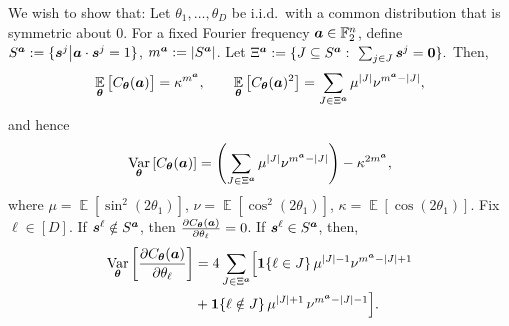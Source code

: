 \documentclass{article}
\theoremstyle{plain}
\theoremstyle{definition}
\theoremstyle{remark}
\begin{document}
We wish to show that: Let $\theta_1,\dots,\theta_D$ be i.i.d.\ with a common distribution that is symmetric about $0$. For a fixed Fourier frequency ${\bm{a}} \in \mathbb{F}_2^n$, define $S^{{\bm{a}}} := \{ {\bm{s}^j} \big| {\bm{a}} \cdot {\bm{s}^j} = 1 \}$, $
m^{\bm{a}} := \abs{S^{{\bm{a}}}}$. Let $
\Xi^{\bm{a}}:= \{J\subseteq S^{\bm{a}}:\ \sum_{j\in J}{\bm{s}^j}=\mathbf 0 \}.$ Then, 
\begin{equation*}
\operatorname*{\mathbb{E}}_{\bm{\theta}}\big[C_{\bm{\theta}}({\bm{a}})\big] = \kappa^{m^{\bm{a}}}, \qquad
\operatorname*{\mathbb{E}}_{\bm{\theta}}\big[C_{\bm{\theta}}({\bm{a}})^2\big] = \sum_{J\in \Xi^{\bm{a}}} \mu^{|J|} \nu^{m^{\bm{a}}-|J|},
\end{equation*}
and hence
\begin{equation*}
     \operatorname*{Var}_{\bm{\theta}} \left[ C_{\bm{\theta}}({\bm{a}}) \right] = 
\left(\sum_{J\in \Xi^{\bm{a}}} \mu^{|J|} \nu^{m^{\bm{a}}-|J|}\right) - \kappa^{2m^{\bm{a}}},
\end{equation*}
where $\mu=\operatorname*{\mathbb{E}}[\sin^2(2\theta_1)]$, $\nu=\operatorname*{\mathbb{E}}[\cos^2(2\theta_1)]$, $\kappa=\operatorname*{\mathbb{E}}[\cos(2\theta_1)]$. Fix $\ell\in[D]$. If ${\bm{s}^\ell} \notin S^{\bm{a}}$, then $ \frac{\partial C_{\bm{\theta}}({\bm{a}})}{\partial \theta_\ell}=0$. If ${\bm{s}^\ell} \in S^{\bm{a}}$, then, 
\begin{align*}
\operatorname*{Var}_{\bm{\theta}} \left[ \frac{\partial C_{\bm{\theta}}({\bm{a}})}{\partial \theta_\ell} \right]
&= 4\sum_{J\in \Xi^{\bm{a}}}
\Bigl[
\bm{1}\{\ell\in J\}\,\mu^{|J|-1}\nu^{m^{\bm{a}}-|J|+1} \notag
\\&+
\bm{1}\{\ell\notin J\}\,\mu^{|J|+1}\,\nu^{m^{\bm{a}}-|J|-1}\Bigr].
\label{eq:symmetric-variance}
\end{align*}
\end{document}
